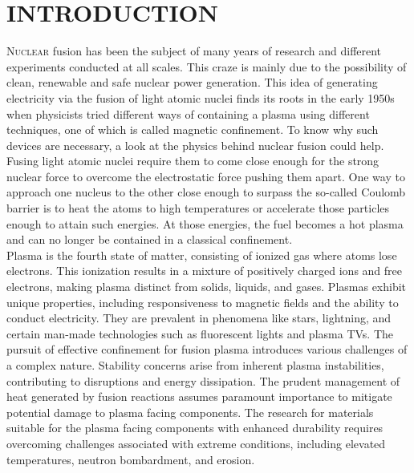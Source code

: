 \chapter{INTRODUCTION}
\lettrine[lines=3, lhang=0.33, loversize=0.25]{N}{uclear} \small{fusion has been the subject of many years of research and different experiments conducted at all scales. This craze is mainly due to the possibility of clean, renewable and safe nuclear power generation. This idea of generating electricity via the fusion of light atomic nuclei finds its roots in the early 1950s when physicists tried different ways of containing a plasma using different techniques, one of which is called magnetic confinement. To know why such devices are necessary, a look at the physics behind nuclear fusion could help. Fusing light atomic nuclei require them to come close enough for the strong nuclear force to overcome the electrostatic force pushing them apart. One way to approach one nucleus to the other close enough to surpass the so-called Coulomb barrier is to heat the atoms to high temperatures or accelerate those particles enough to attain such energies. At those energies, the fuel becomes a hot plasma and can no longer be contained in a classical confinement.}
\\
\break
\small{\indent Plasma is the fourth state of matter, consisting of ionized gas where atoms lose electrons. This ionization results in a mixture of positively charged ions and free electrons, making plasma distinct from solids, liquids, and gases. Plasmas exhibit unique properties, including responsiveness to magnetic fields and the ability to conduct electricity. They are prevalent in phenomena like stars, lightning, and certain man-made technologies such as fluorescent lights and plasma TVs. The pursuit of effective confinement for fusion plasma introduces various challenges of a complex nature. Stability concerns arise from inherent plasma instabilities, contributing to disruptions and energy dissipation. The prudent management of heat generated by fusion reactions assumes paramount importance to mitigate potential damage to plasma facing components. The research for materials suitable for the plasma facing components with enhanced durability requires overcoming challenges associated with extreme conditions, including elevated temperatures, neutron bombardment, and erosion.}
\\
\break
